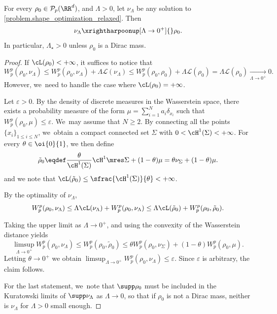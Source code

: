 \begin{lemma}\label{lemma.cvLambdazero}
For every $\rho_0 \in \mathcal{P}_p(\RR^d)$, and $\Lambda>0$, let $\nu_\Lambda$ be any solution to \eqref{problem.shape_optimization_relaxed}. Then
\begin{equation*}
\nu_\Lambda\xrightharpoonup[\Lambda \to 0^+]{} \rho_0.
\end{equation*}
In particular, $\Lambda_\star>0$ unless $\rho_0$ is a Dirac mass.
\end{lemma}

\begin{proof}
If $\cL(\rho_0)<+\infty$, it suffices to notice that
\begin{equation*}
W_p^p(\rho_0, \nu_\Lambda)\leq W_p^p(\rho_0, \nu_\Lambda) + \Lambda \mathcal{L}(\nu_\Lambda) \leq W_p^p(\rho_0, \rho_0) + \Lambda \mathcal{L}(\rho_0) = \Lambda \mathcal{L}(\rho_0)\xrightarrow[\Lambda\to 0^+]{} 0.
\end{equation*}
However, we~need to handle the case where $\cL(\rho_0)=+\infty$.

Let $\varepsilon>0$. By the density of discrete measures in the Wasserstein space, there exists a probability measure of the form $\mu =\sum_{i=1}^{N} a_i \delta_{x_i}$ such that $W_p^p(\rho_0,\mu)\leq \varepsilon$. We~may assume that $N\geq 2$. By connecting all the points $\{x_{i}\}_{1\leq i\leq N}$, we~obtain a compact connected set $\Sigma$ with $0<\cH^1(\Sigma)<+\infty$. For every $\theta \in \oi{0}{1}$,
we then define
\begin{equation*}
\tilde{\rho}_0\eqdef \frac{\theta}{\cH^1(\Sigma)} \cH^1 \mres\Sigma + (1-\theta)\mu
= \theta \nu_\Sigma + (1-\theta)\mu.
\end{equation*}
and we note that
$\cL(\tilde{\rho}_0)\le \sfrac{\cH^1(\Sigma)}{\theta}<+\infty$.

By the optimality of $\nu_{\Lambda}$,
\begin{equation*}
W_p^p(\rho_0,\nu_{\Lambda})\le \Lambda \cL(\nu_{\Lambda})+ W_p^p(\rho_0,\nu_{\Lambda})\le \Lambda \cL(\tilde{\rho}_0)+ W_p^p(\rho_0,\tilde{\rho}_0).
\end{equation*}

Taking the upper limit as $\Lambda\to 0^+$, and using the convexity of the Wasserstein distance yields
\begin{equation*}
\limsup_{\Lambda \to 0^+} W_p^p(\rho_0,\nu_\Lambda)
\le W_p^p(\rho_0,\tilde{\rho}_0) \le
\theta W_p^p\left(\rho_0,\nu_\Sigma\right) +
(1-\theta) W_p^p(\rho_0,\mu).
\end{equation*}
Letting $\theta\to 0^+$ we obtain $\limsup_{\Lambda \to 0^+} W_p^p(\rho_0,\nu_\Lambda)\leq \varepsilon$. Since $\varepsilon$ is arbitrary, the claim follows.

For the last statement, we~note that $\supp \rho_0$ must
be included in the Kuratowski limits of $\supp \nu_\Lambda$ as $\Lambda\to 0$,
so that if $\rho_0$ is not a Dirac mass, neither is $\nu_\Lambda$ for $\Lambda>0$ small enough.
\end{proof}

